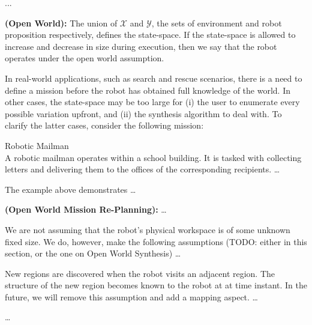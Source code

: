 ...

\begin{myDefinition}
	\textbf{(Open World):} The union of $\mathcal{X}$ and $\mathcal{Y}$, the sets of environment and robot proposition respectively, defines the state-space. If the state-space is allowed to increase and decrease in size during execution, then we say that the robot operates under the open world assumption.
\end{myDefinition}
In real-world applications, such as search and rescue scenarios, there is a need to define a mission before the robot has obtained full knowledge of the world. In other cases, the state-space may be too large for (i) the user to enumerate every possible variation upfront, and (ii) the synthesis algorithm to deal with. To clarify the latter cases, consider the following mission:

\begin{myExample}\label{Ex:mailman1} Robotic Mailman\\
	A robotic mailman operates within a school building. It is tasked with collecting letters and delivering them to the offices of the corresponding recipients. \ldots
\end{myExample}

The example above demonstrates \ldots

\begin{myProblem}
	\textbf{(Open World Mission Re-Planning):} \ldots
\end{myProblem}

We are not assuming that the robot's physical workspace is of some unknown fixed size. We do, however, make the following assumptions (TODO: either in this section, or the one on Open World Synthesis) \ldots

\begin{myAssumption}
	New regions are discovered when the robot visits an adjacent region. The structure of the new region becomes known to the robot at at time instant. In the future, we will remove this assumption and add a mapping aspect. \ldots
\end{myAssumption}

\begin{myAssumption}
	\ldots
\end{myAssumption}